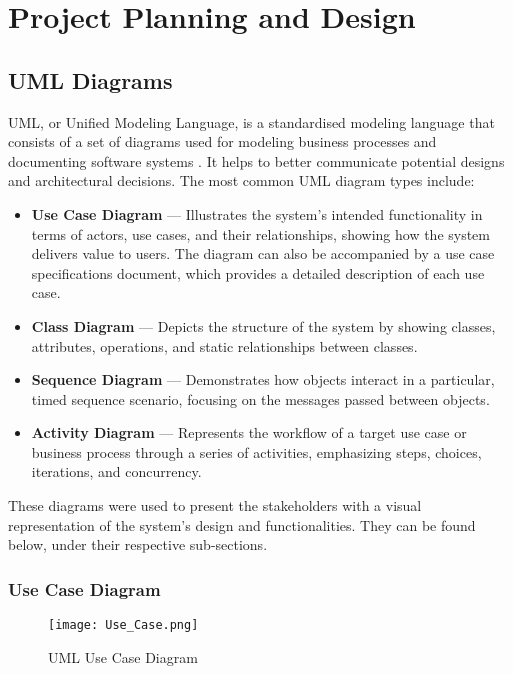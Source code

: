 \chapter{Project Planning and Design}

\section{UML Diagrams}

UML, or Unified Modeling Language, is a standardised modeling language that consists of a set of diagrams used for modeling business processes and documenting software systems \parencite{uml}. It helps to better communicate potential designs and architectural decisions. The most common UML diagram types include:

\begin{itemize}
    \item \textbf{Use Case Diagram} --- Illustrates the system's intended functionality in terms of actors, use cases, and their relationships, showing how the system delivers value to users. The diagram can also be accompanied by a use case specifications document, which provides a detailed description of each use case.
    \item \textbf{Class Diagram} --- Depicts the structure of the system by showing classes, attributes, operations, and static relationships between classes.
    \item \textbf{Sequence Diagram} --- Demonstrates how objects interact in a particular, timed sequence scenario, focusing on the messages passed between objects.
    \item \textbf{Activity Diagram} --- Represents the workflow of a target use case or business process through a series of activities, emphasizing steps, choices, iterations, and concurrency.
\end{itemize}

These diagrams were used to present the stakeholders with a visual representation of the system's design and functionalities. They can be found below, under their respective sub-sections.

\clearpage

\subsection{Use Case Diagram}
\begin{figure}[htbp]
    \centering
    \texttt{[image: Use\_Case.png]}
    \caption{UML Use Case Diagram}\label{fig:uml_usecase}
\end{figure}

